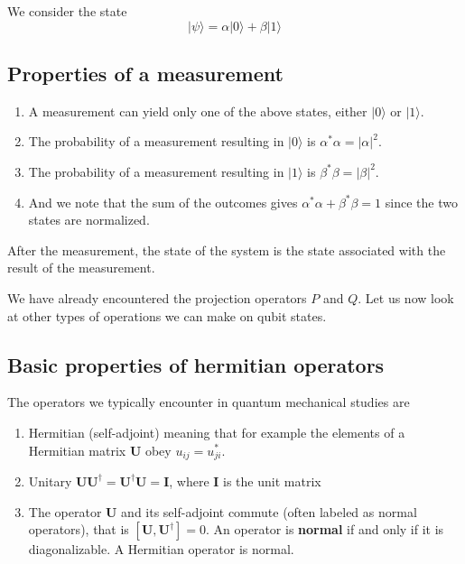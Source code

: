 We  consider the state
\[
\vert \psi\rangle = \alpha \vert 0 \rangle +\beta \vert 1 \rangle
\]

\subsection{Properties of a measurement}

\begin{enumerate}
\item A measurement can yield only one of the above states, either $\vert 0\rangle$ or $\vert 1\rangle$.

\item The probability of a measurement resulting in $\vert 0\rangle$ is $\alpha^*\alpha = \vert \alpha \vert^2$.

\item The probability of a measurement resulting in $\vert 1\rangle$ is $\beta^*\beta = \vert \beta \vert^2$.

\item And we note that the sum of the outcomes gives $\alpha^*\alpha+\beta^*\beta=1$ since the two states are normalized.
\end{enumerate}

\noindent
After the measurement, the state of the system is the state associated with the result of the measurement.

We have already encountered the projection operators $P$ and $Q$. Let
us now look at other types of operations we can make on qubit states.

\subsection{Basic properties of hermitian operators}

The operators we typically encounter in quantum mechanical studies are
\begin{enumerate}
\item Hermitian (self-adjoint) meaning that for example the elements of a Hermitian matrix $\bm{U}$ obey $u_{ij}=u_{ji}^*$.

\item Unitary $\bm{U}\bm{U}^{\dagger}=\bm{U}^{\dagger}\bm{U}=\bm{I}$, where $\bm{I}$ is the unit matrix

\item The operator $\bm{U}$ and its self-adjoint commute (often labeled as normal operators), that is  $[\bm{U},\bm{U}^{\dagger}]=0$. An operator is \textbf{normal} if and only if it is diagonalizable. A Hermitian operator is normal.
\end{enumerate}

